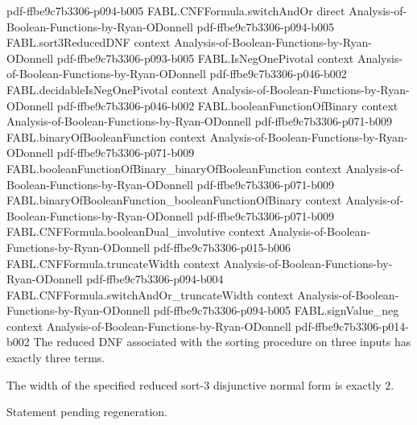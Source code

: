 \begin{theorem}
  {pdf-ffbe9c7b3306-p094-b005}
\proofstep
  {FABL.CNFFormula.switchAndOr}
  {direct}
  {Analysis-of-Boolean-Functions-by-Ryan-ODonnell}
  {pdf-ffbe9c7b3306-p094-b005}
\proofstep
  {FABL.sort3ReducedDNF}
  {context}
  {Analysis-of-Boolean-Functions-by-Ryan-ODonnell}
  {pdf-ffbe9c7b3306-p093-b005}
\proofstep
  {FABL.IsNegOnePivotal}
  {context}
  {Analysis-of-Boolean-Functions-by-Ryan-ODonnell}
  {pdf-ffbe9c7b3306-p046-b002}
\proofstep
  {FABL.decidableIsNegOnePivotal}
  {context}
  {Analysis-of-Boolean-Functions-by-Ryan-ODonnell}
  {pdf-ffbe9c7b3306-p046-b002}
\proofstep
  {FABL.booleanFunctionOfBinary}
  {context}
  {Analysis-of-Boolean-Functions-by-Ryan-ODonnell}
  {pdf-ffbe9c7b3306-p071-b009}
\proofstep
  {FABL.binaryOfBooleanFunction}
  {context}
  {Analysis-of-Boolean-Functions-by-Ryan-ODonnell}
  {pdf-ffbe9c7b3306-p071-b009}
\proofstep
  {FABL.booleanFunctionOfBinary_binaryOfBooleanFunction}
  {context}
  {Analysis-of-Boolean-Functions-by-Ryan-ODonnell}
  {pdf-ffbe9c7b3306-p071-b009}
\proofstep
  {FABL.binaryOfBooleanFunction_booleanFunctionOfBinary}
  {context}
  {Analysis-of-Boolean-Functions-by-Ryan-ODonnell}
  {pdf-ffbe9c7b3306-p071-b009}
\proofstep
  {FABL.CNFFormula.booleanDual_involutive}
  {context}
  {Analysis-of-Boolean-Functions-by-Ryan-ODonnell}
  {pdf-ffbe9c7b3306-p015-b006}
\proofstep
  {FABL.CNFFormula.truncateWidth}
  {context}
  {Analysis-of-Boolean-Functions-by-Ryan-ODonnell}
  {pdf-ffbe9c7b3306-p094-b004}
\proofstep
  {FABL.CNFFormula.switchAndOr_truncateWidth}
  {context}
  {Analysis-of-Boolean-Functions-by-Ryan-ODonnell}
  {pdf-ffbe9c7b3306-p094-b005}
\proofstep
  {FABL.signValue_neg}
  {context}
  {Analysis-of-Boolean-Functions-by-Ryan-ODonnell}
  {pdf-ffbe9c7b3306-p014-b002}
The reduced DNF associated with the sorting procedure on three inputs has exactly three
terms.
\end{theorem}

\begin{theorem}
\label{FABL.width_sort3ReducedDNF}
\leanok
{}
The width of the specified reduced sort-3 disjunctive normal form is exactly $2$.
\end{theorem}

\begin{theorem}
\label{FABL.size_sort3DNF}
\leanok
{}
Statement pending regeneration.
\end{theorem}

